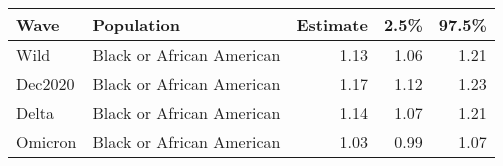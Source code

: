 \begin{table}[ht]
\centering
\begin{tabular}{llrrr}
  \hline
Wave & Population & Estimate & 2.5\% & 97.5\% \\ 
  \hline
Wild & Black or African American & 1.13 & 1.06 & 1.21 \\ 
  Dec2020 & Black or African American & 1.17 & 1.12 & 1.23 \\ 
  Delta & Black or African American & 1.14 & 1.07 & 1.21 \\ 
  Omicron & Black or African American & 1.03 & 0.99 & 1.07 \\ 
   \hline
\end{tabular}
\end{table}
